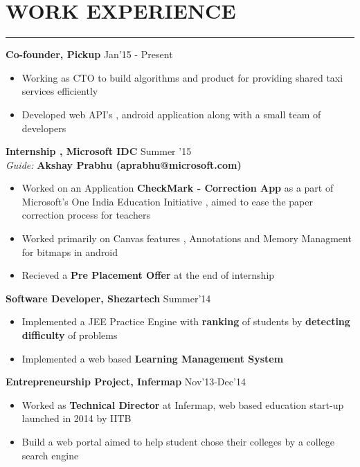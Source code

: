 \documentclass[11pt]{article} %
\begin{document}
\vspace*{40mm}

\section*{WORK EXPERIENCE}
\vspace{-2mm}
\hrule
\medskip

\noindent \textbf{Co-founder, Pickup} \hfill Jan'15 - Present
\vspace{-3mm}
\begin{itemize}
\itemsep-0.4em
\item Working as CTO to build algorithms and product for providing shared taxi services efficiently
\item Developed web API's , android application along with a small team of developers
\end{itemize}
\vspace{-2mm}

\noindent \textbf{Internship , Microsoft IDC} \hfill Summer '15\\
\textit{Guide:} \textbf{Akshay Prabhu  (aprabhu@microsoft.com)}
\vspace{-3mm}
\begin{itemize}
\itemsep-0.4em
\item Worked on an Application \textbf{CheckMark - Correction App} as a part of Microsoft's One India Education Initiative , aimed to ease the paper correction process for teachers
\item Worked primarily on Canvas features , Annotations and Memory Managment for bitmaps in android
\item Recieved a \textbf{Pre Placement Offer} at the end of internship
\end{itemize}
\vspace{-2mm}

\noindent \textbf{Software Developer, Shezartech} \hfill Summer'14
\vspace{-3mm}
\begin{itemize}
\itemsep-0.4em
\item Implemented a JEE Practice Engine with {\bf ranking} of students by {\bf detecting difficulty} of problems
\item Implemented a web based {\bf Learning Management System}
\end{itemize}
\vspace{-2mm}

\noindent \textbf{Entrepreneurship Project, Infermap} \hfill Nov'13-Dec'14
\vspace{-3mm}
\begin{itemize}
\itemsep-0.4em
\item Worked as {\bf Technical Director} at Infermap, web based education start-up launched in 2014 by IITB
\item Build a web portal aimed to help student chose their colleges by a college search engine
\end{itemize}
\vspace{-3mm}
\end{document}

